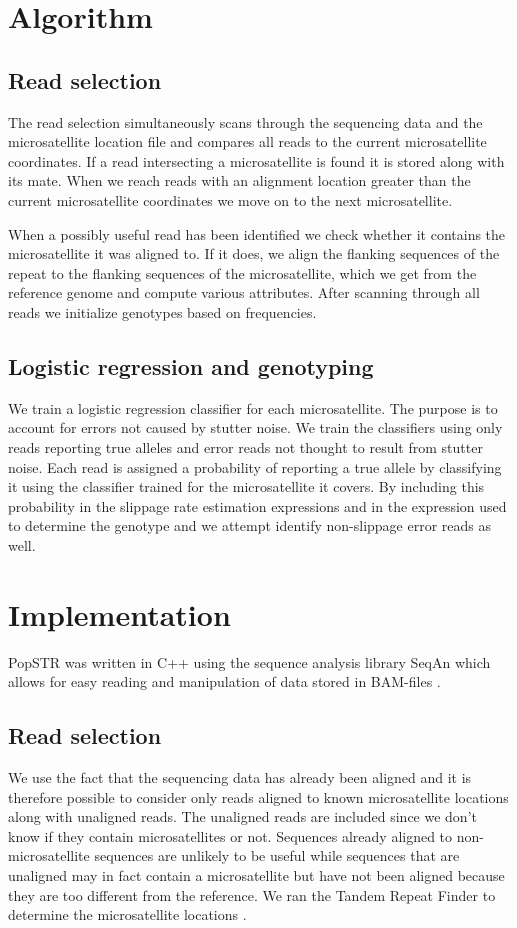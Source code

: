 \documentclass{bioinfo}
\begin{document}
\section{Algorithm}
\subsection{Read selection}
    The read selection simultaneously scans through the sequencing data and the microsatellite location file and compares all reads to the current microsatellite coordinates. If a read intersecting a microsatellite is found it is stored along with its mate. When we reach reads with an alignment location greater than the current microsatellite coordinates we move on to the next microsatellite.
    
    \noindent When a possibly useful read has been identified we check whether it contains the microsatellite it was aligned to. If it does, we align the flanking sequences of the repeat to the flanking sequences of the microsatellite, which we get from the reference genome and compute various attributes.
    After scanning through all reads we initialize genotypes based on frequencies.
\subsection{Logistic regression and genotyping}
    We train a logistic regression classifier for each microsatellite. The purpose is to account for errors not caused by stutter noise. We train the classifiers using only reads reporting true alleles and error reads not thought to result from stutter noise. Each read is assigned a probability of reporting a true allele by classifying it using the classifier trained for the microsatellite it covers. By including this probability in the slippage rate estimation expressions and in the expression used to determine the genotype and we attempt identify non-slippage error reads as well.
\section{Implementation}
PopSTR was written in C++ using the sequence analysis library SeqAn which allows for easy reading and manipulation of data stored in BAM-files \cite{Doering2008}.
\subsection{Read selection}
    We use the fact that the sequencing data has already been aligned and it is therefore possible to consider only reads aligned to known microsatellite locations along with unaligned reads. The unaligned reads are included since we don't know if they contain microsatellites or not. Sequences already aligned to non-microsatellite sequences are unlikely to be useful while sequences that are unaligned may in fact contain a microsatellite but have not been aligned because they are too different from the reference. We ran the Tandem Repeat Finder to determine the microsatellite locations \cite{TRF}.
    
\end{document}
